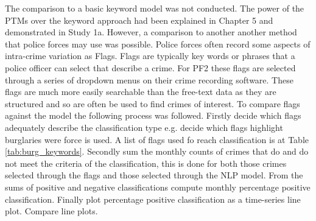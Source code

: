 The comparison to a basic keyword model was not conducted. The power of the PTMs over the keyword approach had been explained in Chapter 5 and demonstrated in Study 1a. However, a comparison to another another method that police forces may use was possible. Police forces often record some aspects of intra-crime variation as Flags. Flags are typically key words or phrases that a police officer can select that describe a crime. For PF2 these flags are selected through a series of dropdown menus on their crime recording software. These flags are much more easily searchable than the free-text data as they are structured and so are often be used to find crimes of interest. To compare flags against the model the following process was followed. Firstly decide which flags adequately describe the classification type e.g. decide which flags highlight burglaries were force is used. A  list of flags used fo reach classification is at Table \ref{tab:burg_keywords}. Secondly sum the monthly counts of crimes that do and do not meet the criteria of the classification, this is done for both those crimes selected through the flags and those selected through the NLP model. From the sums of positive and negative classifications compute monthly percentage positive classification. Finally plot percentage positive classification as a time-series line plot. Compare line plots.

